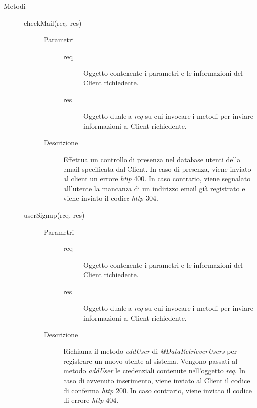 \begin{description}
 \item[Metodi] \hfill
  \begin{description}
    \item[checkMail(req, res)] \hfill
      \begin{description}
	\item[Parametri] \hfill
	  \begin{description}
	    \item[req]
	    Oggetto contenente i parametri e le informazioni del Client richiedente.
	    \item[res]
	    Oggetto duale a \textit{req} su cui invocare i metodi per inviare informazioni al Client richiedente.
	  \end{description}
	\item[Descrizione]
	Effettua un controllo di presenza nel database utenti della email specificata dal Client. In caso di presenza, 
	viene inviato al client un errore \textit{http} 400. In caso contrario, viene segnalato all'utente la mancanza 
	di un indirizzo email già registrato e viene inviato il codice \textit{http} 304.
      \end{description}
    \item[userSignup(req, res)] \hfill
      \begin{description}
	\item[Parametri] \hfill
	  \begin{description}
	    \item[req]
	    Oggetto contenente i parametri e le informazioni del Client richiedente.
	    \item[res]
	    Oggetto duale a \textit{req} su cui invocare i metodi per inviare informazioni al Client richiedente.
	  \end{description}
	\item[Descrizione]
	Richiama il metodo \textit{addUser} di \textit{@DataRetrieverUsers} per registrare un nuovo utente al sistema. 
	Vengono passati al metodo \textit{addUser} le credenziali contenute nell'oggetto \textit{req}. In caso di avvenuto 
	inserimento, viene inviato al Client il codice di conferma \textit{http} 200. In caso contrario, viene inviato il 
	codice di errore \textit{http} 404.
      \end{description}
    

\end{description}
\end{description}
